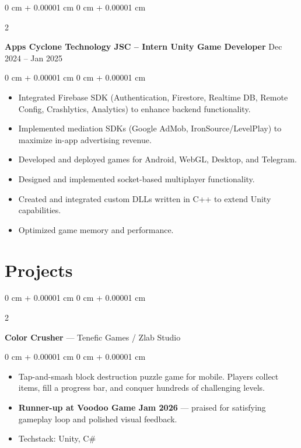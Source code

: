 \documentclass[10pt, letterpaper]{article}
\newenvironment{highlights}{
    \begin{itemize}[
        topsep=0.10 cm,
        parsep=0.10 cm,
        partopsep=0pt,
        itemsep=0pt,
        leftmargin=0 cm + 10pt
    ]
}{
    \end{itemize}
} %
\newenvironment{onecolentry}{
    \begin{adjustwidth}{
        0 cm + 0.00001 cm
    }{
        0 cm + 0.00001 cm
    }
}{
    \end{adjustwidth}
} %
\newenvironment{twocolentry}[2][]{
    \onecolentry
    \def\secondColumn{#2}
    \setcolumnwidth{\fill, 4.5 cm}
    \begin{paracol}{2}
}{
    \switchcolumn \raggedleft \secondColumn
    \end{paracol}
    \endonecolentry
} %
\begin{document}
        \vspace{0.2 cm}

        \begin{twocolentry}{
            Dec 2024 -- Jan 2025
        }
            \textbf{Apps Cyclone Technology JSC -- Intern Unity Game Developer}\end{twocolentry}
        \vspace{0.10 cm}
        \begin{onecolentry}
            \begin{highlights}
                \item Integrated Firebase SDK (Authentication, Firestore, Realtime DB, Remote Config, Crashlytics, Analytics) to enhance backend functionality.
                \item Implemented mediation SDKs (Google AdMob, IronSource/LevelPlay) to maximize in-app advertising revenue.
                \item Developed and deployed games for Android, WebGL, Desktop, and Telegram.
                \item Designed and implemented socket-based multiplayer functionality.
                \item Created and integrated custom DLLs written in C++ to extend Unity capabilities.
                \item Optimized game memory and performance.
            \end{highlights}
        \end{onecolentry}


    \section{Projects}

        \begin{twocolentry}{
            2026
        }
            \textbf{Color Crusher} — Tenefic Games / Zlab Studio\end{twocolentry}
        \vspace{0.10 cm}
        \begin{onecolentry}
            \begin{highlights}
                \item Tap-and-smash block destruction puzzle game for mobile. Players collect items, fill a progress bar, and conquer hundreds of challenging levels.
                \item \textbf{Runner-up at Voodoo Game Jam 2026} — praised for satisfying gameplay loop and polished visual feedback.
                \item Techstack: Unity, C\#
            \end{highlights}
        \end{onecolentry}
\end{document}
